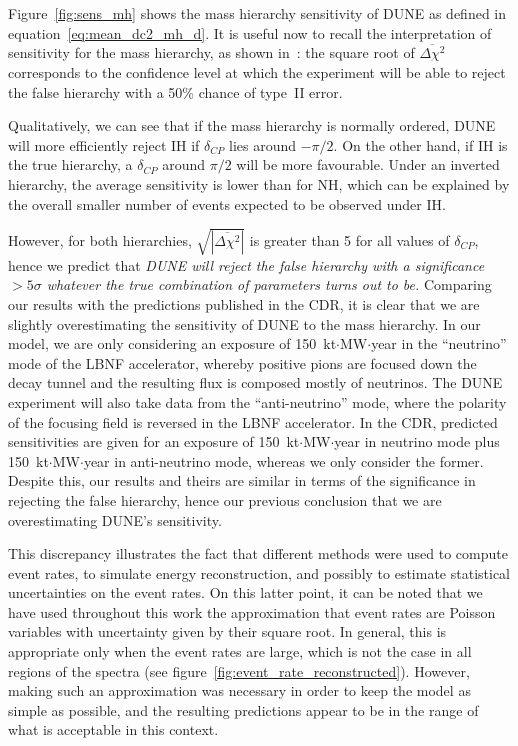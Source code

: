 Figure~\ref{fig:sens_mh} shows the mass hierarchy sensitivity of DUNE as
defined in equation~\ref{eq:mean_dc2_mh_d}. It is useful now to recall the
interpretation of sensitivity for the mass hierarchy, as shown
in~\cite{blennow}: the square root of $\overline{\Delta\chi^2}$ corresponds to
the confidence level at which the experiment will be able to reject the false
hierarchy with a 50\% chance of type~II error.

Qualitatively, we can see that if
the mass hierarchy is normally ordered, DUNE will more efficiently reject IH
if $\delta_{CP}$ lies around $-\pi/2$. On the other hand, if IH is the true
hierarchy, a $\delta_{CP}$ around $\pi/2$ will be more favourable. Under an
inverted hierarchy, the average sensitivity is lower than for NH, which can be
explained by the overall smaller number of events expected to be observed under
IH. 

However, for both hierarchies, $\sqrt{|\overline{\Delta\chi^2}|}$ is greater
than 5 for all values of $\delta_{CP}$, hence we predict that \emph{DUNE will
reject the false hierarchy with a significance $>5\sigma$ whatever the true
combination of parameters turns out to be.}
Comparing our results with the predictions published in the CDR, it is clear
that we are slightly overestimating the sensitivity of DUNE to the mass hierarchy.
In our model, we are only considering an exposure of 150~kt$\cdot$MW$\cdot$year
in the ``neutrino'' mode of the LBNF accelerator, whereby positive pions are
focused down the decay tunnel and the resulting flux is composed mostly of
neutrinos. The DUNE experiment will also take data from the ``anti-neutrino''
mode, where the polarity of the focusing field is reversed in the LBNF
accelerator. In the CDR, predicted sensitivities are given for an exposure of
150~kt$\cdot$MW$\cdot$year in neutrino mode plus 150~kt$\cdot$MW$\cdot$year in
anti-neutrino mode, whereas we only consider the former. Despite this, our
results and theirs are similar in terms of the significance in rejecting the
false hierarchy, hence our previous conclusion that we are overestimating
DUNE's sensitivity.

This discrepancy illustrates the fact that different methods were used to
compute event rates, to simulate energy reconstruction, and possibly to
estimate statistical uncertainties on the event rates. On this latter point, it
can be noted that we have used throughout this work the approximation that
event rates are Poisson variables with uncertainty given by their square root.
In general, this is appropriate only when the event rates are large, which is
not the case in all regions of the spectra (see
figure~\ref{fig:event_rate_reconstructed}). However, making such an
approximation was necessary in order to keep the model as simple as possible,
and the resulting predictions appear to be in the range of what is acceptable
in this context.

